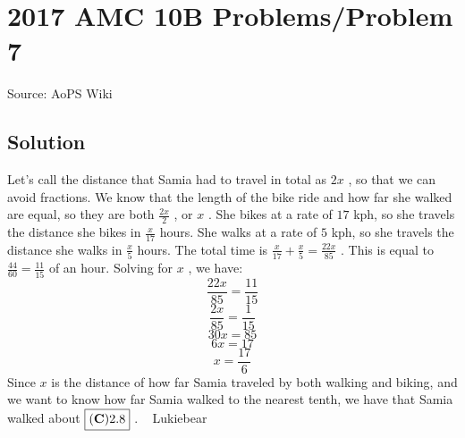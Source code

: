 \documentclass[12pt]{article}
\begin{document}
\section*{{2017 AMC 10B Problems/Problem 7}}
Source: AoPS Wiki

\subsection*{Solution}
Let's call the distance that Samia had to travel in total as $2x$ , so that we can avoid fractions. We know that the length of the bike ride and how far she walked are equal, so they are both $\frac{2x}{2}$ , or $x$ . She bikes at a rate of $17$ kph, so she travels the distance she bikes in $\frac{x}{17}$ hours. She walks at a rate of $5$ kph, so she travels the distance she walks in $\frac{x}{5}$ hours. The total time is $\frac{x}{17}+\frac{x}{5} = \frac{22x}{85}$ . This is equal to $\frac{44}{60} = \frac{11}{15}$ of an hour. Solving for $x$ , we have: \[\frac{22x}{85} = \frac{11}{15}\] \[\frac{2x}{85} = \frac{1}{15}\] \[30x = 85\] \[6x = 17\] \[x = \frac{17}{6}\] Since $x$ is the distance of how far Samia traveled by both walking and biking, and we want to know how far Samia walked to the nearest tenth, we have that Samia walked about $\boxed{\bold{(C)} 2.8}$ . ~ Lukiebear
\end{document}
